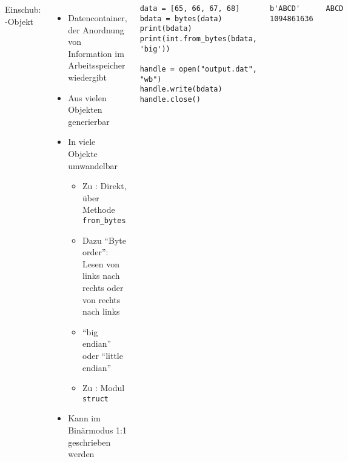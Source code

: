 \begin{frame}[fragile]
%
\begin{columns}[T]
\begin{Large}
	{Einschub: -Objekt}
	\vspace{6pt}
\end{Large}
%
\begin{itemize}
\item Datencontainer, der Anordnung von Information im Arbeitsspeicher wiedergibt
\item Aus vielen Objekten generierbar
\item In viele Objekte umwandelbar
	\begin{itemize}
	\item Zu : Direkt, über Methode \texttt{from\_bytes}
	\item Dazu \enquote{Byte order}: Lesen von links nach rechts oder von rechts nach links
	\item \enquote{big endian} oder \enquote{little endian}
	\item Zu : Modul \texttt{struct}
	\end{itemize}
\item Kann im Binärmodus 1:1 geschrieben werden
\end{itemize}
%
\begin{codebox}
\begin{verbatim}
data = [65, 66, 67, 68]
bdata = bytes(data)
print(bdata)
print(int.from_bytes(bdata, 'big'))

handle = open("output.dat", "wb")
handle.write(bdata)
handle.close()
\end{verbatim}
\end{codebox}
%
\begin{cmdbox}
\begin{verbatim}
b'ABCD'
1094861636
\end{verbatim}
\end{cmdbox}
%
\begin{cmdbox}
\begin{verbatim}
ABCD
\end{verbatim}
\end{cmdbox}
\end{columns}
%
\end{frame}


